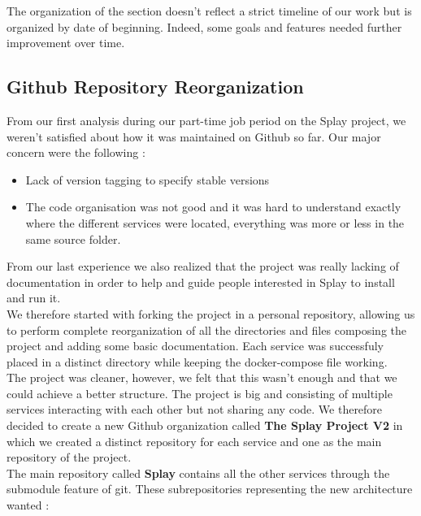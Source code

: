 \documentclass{eplmastersthesis}
\begin{document}
      The organization of the section doesn't reflect a strict timeline of
      our work but is organized by date of beginning. Indeed, some goals
      and features needed further improvement over time.

      \subsection{Github Repository Reorganization}

        From our first analysis during our part-time job period on the Splay
        project, we weren't satisfied about how it was maintained on Github so
        far. Our major concern were the following :

        \begin{itemize}
          \item Lack of version tagging to specify stable versions
          \item The code organisation was not good and it was hard to
          understand exactly where the different services were located,
          everything was more or less in the same source folder.
        \end{itemize}

        From our last experience we also realized that the project was really
        lacking of documentation in order to help and guide people interested
        in Splay to install and run it.\\

        We therefore started with forking the project in a personal repository,
        allowing us to perform complete reorganization of all the directories
        and files composing the project and adding some basic documentation.
        Each service was successfuly placed in a distinct directory while
        keeping the docker-compose file working.\\
        The project was cleaner, however, we felt that this wasn't enough
        and that we could achieve a better structure. The project is big and
        consisting of multiple services interacting with each other but
        not sharing any code. We therefore decided to create a new Github
        organization called \textbf{The Splay Project V2} in which we created
        a distinct repository for each service and one as the main repository
        of the project.\\

        The main repository called \textbf{Splay} contains all the other services
        through the submodule \cite{GitSubmodules} feature of git. These
        subrepositories representing the new architecture wanted :
\end{document}
